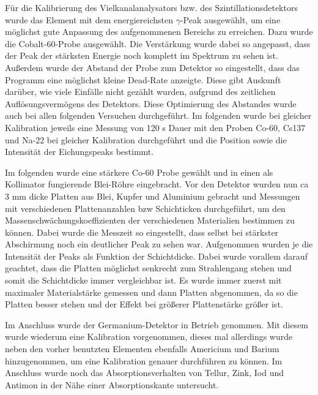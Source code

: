 \documentclass[
	parskip=half,10pt,
	numbers= noenddot, %
	toc=flat, %
	oneside,
	twocolumn,
	]{scrartcl}
\begin{document}
Für die Kalibrierung des Vielkanalanalysators bzw. des Szintillationsdetektors wurde das Element mit dem energiereichsten 
$\gamma$-Peak ausgewählt, um eine möglichst gute Anpassung des aufgenommenen Bereichs zu erreichen. 
Dazu wurde die Cobalt-60-Probe ausgewählt. Die Verstärkung wurde dabei so angepasst, dass der Peak der stärksten Energie noch 
komplett im Spektrum zu sehen ist. Außerdem wurde der Abstand der Probe zum Detektor so eingestellt, dass das Programm eine möglichst 
kleine Dead-Rate anzeigte. Diese gibt Auskunft darüber, wie viele Einfälle nicht gezählt wurden, aufgrund des zeitlichen 
Auflösungsvermögens des Detektors. Diese Optimierung des Abstandes wurde auch bei allen folgenden Versuchen durchgeführt. 
Im folgenden wurde bei gleicher Kalibration jeweils eine Messung von 120 s Dauer mit den Proben 
Co-60, Cs137 und Na-22 bei gleicher Kalibration durchgeführt und die Position sowie die Intensität der Eichungspeaks bestimmt. 

Im folgenden wurde eine stärkere Co-60 Probe gewählt und in einen als Kollimator fungierende Blei-Röhre eingebracht. Vor den Detektor 
wurden nun ca 3 mm dicke Platten aus Blei, Kupfer und Aluminium gebracht und Messungen mit verschiedenen Plattenanzahlen bzw Schichticken 
durchgeführt, um den Massenschwächungskoeffizienten der verschiedenen Materialien bestimmen zu können. Dabei wurde die Messzeit so 
eingestellt, dass selbst bei stärkster Abschirmung noch ein deutlicher Peak zu sehen war. Aufgenommen wurden je die Intensität der 
Peaks als Funktion der Schichtdicke. Dabei wurde vorallem darauf geachtet, dass die Platten möglichst senkrecht zum Strahlengang stehen 
und somit die Schichtdicke immer vergleichbar ist. Es wurde immer zuerst mit maximaler Materialstärke gemessen und dann Platten 
abgenommen, da so die Platten besser stehen und der Effekt bei größerer Plattenstärke größer ist. 

Im Anschluss wurde der Germanium-Detektor in Betrieb genommen. Mit diesem wurde wiederum eine Kalibration vorgenommen, dieses mal allerdings wurde neben den 
vorher benutzten Elementen ebenfalls Americium und Barium hinzugenommen, um eine Kalibration genauer durchführen zu können. Im Anschluss wurde 
noch das Absorptionsverhalten von Tellur, Zink, Iod und Antimon in der Nähe einer Absorptionskante untersucht. 

%
\end{document}
